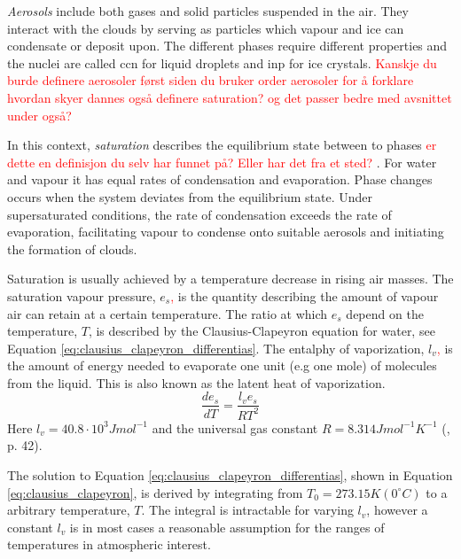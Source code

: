 \textit{Aerosols} include both gases and solid particles suspended in the air. They interact with the clouds by serving as particles which vapour and ice can condensate or deposit upon. The different phases require different properties and the nuclei are called \acrfull{ccn} for liquid droplets and \acrfull{inp} for ice crystals. 
\textcolor{red}{Kanskje du burde definere aerosoler først siden du bruker order aerosoler for å forklare hvordan skyer dannes også definere saturation? og det passer bedre med avsnittet under også?}


In this context, \textit{saturation} describes the equilibrium state between to phases \textcolor{red}{er dette en definisjon du selv har funnet på? Eller har det fra et sted? }. For water and vapour it has equal rates of condensation and evaporation. Phase changes occurs when the system deviates from the equilibrium state. Under supersaturated conditions, the rate of condensation exceeds the rate of evaporation, facilitating vapour to condense onto suitable aerosols and initiating the formation of clouds. 

Saturation is usually achieved by a temperature decrease in rising air masses. The saturation vapour pressure, $e_s$\textcolor{red}{,} is the quantity describing the amount of vapour air can retain at a certain temperature. The ratio at which $e_s$ depend on the temperature, $T$, is described by the Clausius-Clapeyron equation for water, see Equation \eqref{eq:clausius_clapeyron_differentias}. The entalphy of vaporization, $l_v$\textcolor{red}{,} is the amount of energy needed to evaporate one unit (e.g one mole) of molecules from the liquid. This is also known as the latent heat of vaporization. 
\begin{equation} \label{eq:clausius_clapeyron_differentias}
    \frac{de_s}{dT} = \frac{l_v e_s}{R T^2}
\end{equation}
Here $l_v = 40.8 \cdot 10^3 J mol^{-1}$ and the universal gas constant $R= 8.314 J mol^{-1} K^{-1}$ (\cite{cloud_phys_book_johanne}, p. 42). 

The solution to Equation \eqref{eq:clausius_clapeyron_differentias}, shown in Equation \eqref{eq:clausius_clapeyron}, is derived by integrating from $T_0 = 273.15K \left(0 ^{\circ}C \right)$ to a arbitrary temperature, $T$. The integral is intractable for varying $l_v$, however a constant $l_v$ is in most cases a reasonable assumption for the ranges of temperatures in atmospheric interest.

